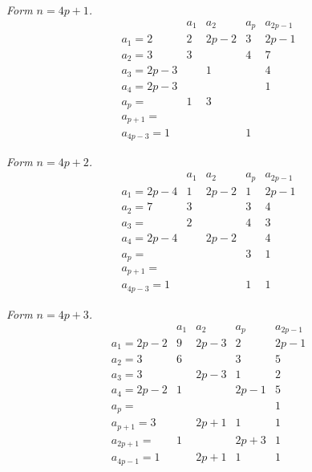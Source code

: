 \documentclass[11pt]{article}
\begin{document}
\noindent\textit{Form $n=4p+1$.}
\[
\begin{array}{l|cccc}
              & a_{1} & a_{2} & a_{p}   & a_{2p-1}\\
\hline
a_{1}=2       & 2     & 2p-2  & 3       & 2p-1\\
a_{2}=3       & 3     &       & 4       & 7\\
a_{3}=2p-3    &       & 1     &         & 4\\
a_{4}=2p-3    &       &       &         & 1\\
a_{p}=        & 1     & 3     &         & \\
a_{p+1}=      &       &       &         & \\
a_{4p-3}=1    &       &       & 1       &
\end{array}
\]

\noindent\textit{Form $n=4p+2$.}
\[
\begin{array}{l|cccc}
              & a_{1} & a_{2} & a_{p}   & a_{2p-1}\\
\hline
a_{1}=2p-4    & 1     & 2p-2  & 1       & 2p-1\\
a_{2}=7       & 3     &       & 3       & 4\\
a_{3}=        & 2     &       & 4       & 3\\
a_{4}=2p-4    &       & 2p-2  &         & 4\\
a_{p}=        &       &       & 3       & 1\\
a_{p+1}=      &       &       &         & \\
a_{4p-3}=1    &       &       & 1       & 1
\end{array}
\]

\noindent\textit{Form $n=4p+3$.}
\[
\begin{array}{l|cccc}
              & a_{1} & a_{2} & a_{p}   & a_{2p-1}\\
\hline
a_{1}=2p-2    & 9     & 2p-3  & 2       & 2p-1\\
a_{2}=3       & 6     &       & 3       & 5\\
a_{3}=3       &       & 2p-3  & 1       & 2\\
a_{4}=2p-2    & 1     &       & 2p-1    & 5\\
a_{p}=        &       &       &         & 1\\
a_{p+1}=3     &       & 2p+1  & 1       & 1\\
a_{2p+1}=     & 1     &       & 2p+3    & 1\\
a_{4p-1}=1    &       & 2p+1  & 1       & 1
\end{array}
\]
\end{document}
